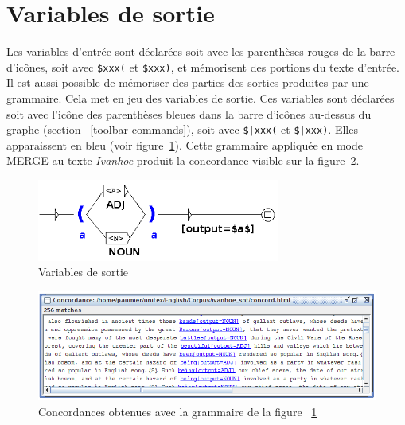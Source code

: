 

\newpage

\section{Variables de sortie}
\label{section-output-variables}
Les variables d'entrée sont déclarées soit avec les parenthèses rouges de la barre d'icônes,
soit avec \verb+$xxx(+ et \verb+$xxx)+, et mémorisent des portions du
texte d'entrée. 
Il est aussi possible de mémoriser des parties des sorties produites par une grammaire.
Cela met en jeu des variables de sortie.
Ces variables sont déclarées soit avec l'icône des parenthèses bleues
dans la barre d'icônes au-dessus du graphe (section ~\ref{toolbar-commands}),
soit avec \verb+$|xxx(+ et \verb+$|xxx)+.
Elles apparaissent en bleu (voir figure~\ref{fig-output-variables}).
Cette grammaire appliquée en mode MERGE au texte \textit{Ivanhoe} produit la
concordance visible sur la figure~\ref{fig-output-variables-concord}. 

\begin{figure}[!ht]
\begin{center}
\includegraphics[width=8cm]{resources/img/fig6-17r.png}
\caption{Variables de sortie\label{fig-output-variables}}
\end{center}
\end{figure}

\begin{figure}[!ht]
\begin{center}
\includegraphics[width=15cm]{resources/img/fig6-17s.png}
\caption{Concordances obtenues avec la grammaire de la figure ~\ref{fig-output-variables}\label{fig-output-variables-concord}}
\end{center}
\end{figure}

